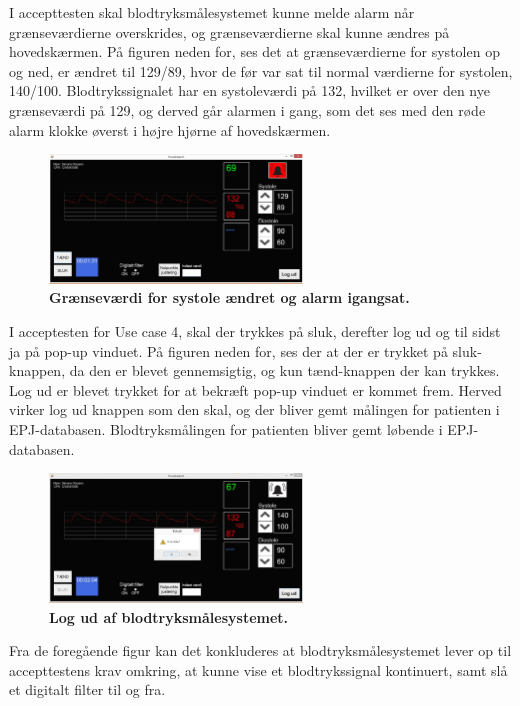 I accepttesten skal blodtryksmålesystemet kunne melde alarm når grænseværdierne overskrides, og grænseværdierne skal kunne ændres på hovedskærmen. På figuren neden for, ses det at grænseværdierne for systolen op og ned, er ændret til 129/89, hvor de før var sat til normal værdierne for systolen, 140/100. Blodtrykssignalet har en systoleværdi på 132, hvilket er over den nye grænseværdi på 129, og derved går alarmen i gang, som det ses med den røde alarm klokke øverst i højre hjørne af hovedskærmen. 
\begin{figure}[H]
\includegraphics[width =0.6\textwidth , center]{billeder/IThovedGUIAlarm}
\caption{\textbf{Grænseværdi for systole ændret og alarm igangsat.}}
\end{figure}
I acceptesten for Use case 4, skal der trykkes på sluk, derefter log ud og til sidst ja på pop-up vinduet. På figuren neden for, ses der at der er trykket på sluk-knappen, da den er blevet gennemsigtig, og kun tænd-knappen der kan trykkes. Log ud er blevet trykket for at bekræft pop-up vinduet er kommet frem. Herved virker log ud knappen som den skal, og der bliver gemt målingen for patienten i EPJ-databasen. Blodtryksmålingen for patienten bliver gemt løbende i EPJ-databasen. 
\begin{figure}[H]
\includegraphics[width =0.6\textwidth , center]{billeder/IThovedGUILogUd}
\caption{\textbf{Log ud af blodtryksmålesystemet.}}
\end{figure}
Fra de foregående figur kan det konkluderes at blodtryksmålesystemet lever op til accepttestens krav omkring, at kunne vise et blodtrykssignal kontinuert, samt slå et digitalt filter til og fra. \\\\
